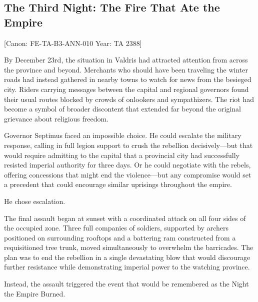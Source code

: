 \subsection{The Third Night: The Fire That Ate the
Empire}\label{the-third-night-the-fire-that-ate-the-empire}

{[}Canon: FE-TA-B3-ANN-010 \textbar{} Year: TA 2388{]}

By December 23rd, the situation in Valdris had attracted attention from
across the province and beyond. Merchants who should have been traveling
the winter roads had instead gathered in nearby towns to watch for news
from the besieged city. Riders carrying messages between the capital and
regional governors found their usual routes blocked by crowds of
onlookers and sympathizers. The riot had become a symbol of broader
discontent that extended far beyond the original grievance about
religious freedom.

Governor Septimus faced an impossible choice. He could escalate the
military response, calling in full legion support to crush the rebellion
decisively---but that would require admitting to the capital that a
provincial city had successfully resisted imperial authority for three
days. Or he could negotiate with the rebels, offering concessions that
might end the violence---but any compromise would set a precedent that
could encourage similar uprisings throughout the empire.

He chose escalation.

The final assault began at sunset with a coordinated attack on all four
sides of the occupied zone. Three full companies of soldiers, supported
by archers positioned on surrounding rooftops and a battering ram
constructed from a requisitioned tree trunk, moved simultaneously to
overwhelm the barricades. The plan was to end the rebellion in a single
devastating blow that would discourage further resistance while
demonstrating imperial power to the watching province.

Instead, the assault triggered the event that would be remembered as the
Night the Empire Burned.

